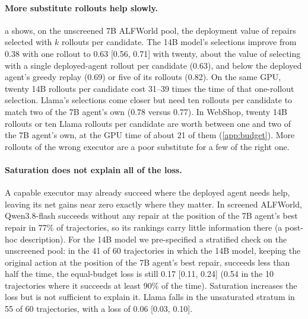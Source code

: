 \documentclass{article}
\theoremstyle{plain}
\theoremstyle{definition}
\theoremstyle{remark}
\begin{document}
\paragraph{More substitute rollouts help slowly.}
a shows, on the unscreened 7B ALFWorld pool, the deployment value of repairs selected with $k$ rollouts per candidate. The 14B model's selections improve from 0.38 with one rollout to 0.63 [0.56, 0.71] with twenty, about the value of selecting with a single deployed-agent rollout per candidate (0.63), and below the deployed agent's greedy replay (0.69) or five of its rollouts (0.82). On the same GPU, twenty 14B rollouts per candidate cost 31--39 times the time of that one-rollout selection. Llama's selections come closer but need ten rollouts per candidate to match two of the 7B agent's own (0.78 versus 0.77). In WebShop, twenty 14B rollouts or ten Llama rollouts per candidate are worth between one and two of the 7B agent's own, at the GPU time of about 21 of them (\cref{app:budget}). More rollouts of the wrong executor are a poor substitute for a few of the right one.

\paragraph{Saturation does not explain all of the loss.}
A capable executor may already succeed where the deployed agent needs help, leaving its net gains near zero exactly where they matter. In screened ALFWorld, Qwen3.8-flash succeeds without any repair at the position of the 7B agent's best repair in 77\% of trajectories, so its rankings carry little information there (a post-hoc description). For the 14B model we pre-specified a stratified check on the unscreened pool: in the 41 of 60 trajectories in which the 14B model, keeping the original action at the position of the 7B agent's best repair, succeeds less than half the time, the equal-budget loss is still 0.17 [0.11, 0.24] (0.54 in the 10 trajectories where it succeeds at least 90\% of the time). Saturation increases the loss but is not sufficient to explain it. Llama falls in the unsaturated stratum in 55 of 60 trajectories, with a loss of 0.06 [0.03, 0.10].
\end{document}

